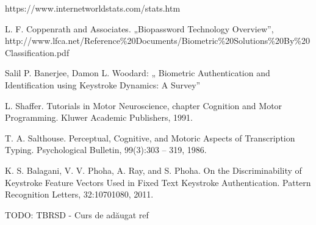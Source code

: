 \documentclass[9pt,shortpaper,twoside,web]{ieeecolor}
\begin{document}
\begin{thebibliography}{00}

 https://www.internetworldstats.com/stats.htm

 L. F. Coppenrath and Associates. „Biopassword Technology Overview”, http://www.lfca.net/Reference\%20Documents/Biometric\%20Solutions\%20By\%20Classification.pdf

 Salil P. Banerjee, Damon L. Woodard: „ Biometric Authentication and Identification using Keystroke Dynamics: A Survey”

 L. Shaffer. Tutorials in Motor Neuroscience, chapter Cognition and Motor Programming.
Kluwer Academic Publishers, 1991.

 T. A. Salthouse. Perceptual, Cognitive, and Motoric Aspects of Transcription Typing. Psychological Bulletin, 99(3):303 – 319, 1986.

 K. S. Balagani, V. V. Phoha, A. Ray, and S. Phoha. On the Discriminability of Keystroke Feature Vectors Used in Fixed Text Keystroke Authentication. Pattern Recognition Letters, 32:10701080, 2011.

 TODO: TBRSD - Curs de adăugat ref
\end{thebibliography}
\end{document}
